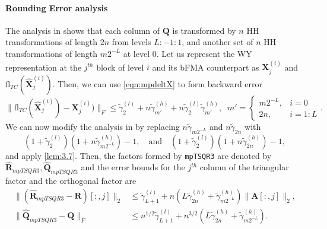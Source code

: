 \documentclass[review,onefignum,onetabnum]{siamart190516}
\newcommand{\bb}[1]{\mathbf{#1}}
\newcommand{\fl}{\mathrm{fl}}
\begin{document}
\paragraph{Rounding Error analysis} The analysis in \cite{Mori2012} shows that each column of $\bb{Q}$ is transformed by $n$ HH transformations of length $2n$ from levels $L:-1:1$, and another set of $n$ HH transformations of length $m2^{-L}$ at level $0$.
Let us represent the WY representation at the $j^{th}$ block of level $i$ and its bFMA counterpart as $\bb{X}_j^{(i)}$ and $\fl_{TC}(\hat{\bb{X}}_j^{(i)})$.
Then, we can use \cref{eqn:mpdeltX} to form backward error  
\begin{equation}
\|\fl_{TC}(\hat{\bb{X}}_j^{(i)})-\bb{X}_j^{(i)})\|_F \leq \tilde{\gamma}_2^{(l)} +n\tilde{\gamma}_{m'}^{(h)} + n\tilde{\gamma}_2^{(l)}\tilde{\gamma}_{m'}^{(h)}, \;\; m' = \begin{cases}
m2^{-L}, &i=0\\
2n, & i = 1 : L
\end{cases}.
\end{equation}
We can now modify the analysis in \cite{Mori2012} by replacing $n\tilde{\gamma}_{m2^{-L}}$ and $n\tilde{\gamma}_{2n}$ with \[(1+\tilde{\gamma}_2^{(l)})(1+n\tilde{\gamma}_{m2^{-L}}^{(h)})-1,\quad\text{and}\quad (1+\tilde{\gamma}_2^{(l)})(1+n\tilde{\gamma}_{2n}^{(h)})-1,\]
and apply \cref{lem:3.7}.
Then, the factors formed by {\tt mpTSQR3} are denoted by $\hat{\bb{R}}_{mpTSQR3},\hat{\bb{Q}}_{mpTSQR3}$ and the error bounds for the $j^{th}$ column of the triangular factor and the orthogonal factor are
\begin{align*}
\|(\hat{\bb{R}}_{mpTSQR3}- \bb{R})[:,j]\|_2 &\leq \tilde{\gamma}_{L+1}^{(l)}+n\left(L\tilde{\gamma}_{2n}^{(h)}+\tilde{\gamma}_{m2^{-L}}^{(h)}\right)\|\bb{A}[:,j]\|_2\label{eqn:mpTSQR1},\\
\|\hat{\bb{Q}}_{mpTSQR3} - \bb{Q}\|_F &\leq n^{1/2}\tilde{\gamma}_{L+1}^{(l)}+n^{3/2}\left(L\tilde{\gamma}_{2n}^{(h)}+\tilde{\gamma}_{m2^{-L}}^{(h)}\right).
\end{align*}
\end{document}
